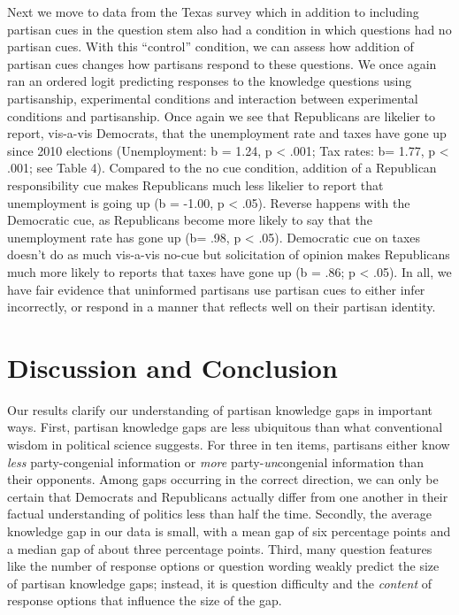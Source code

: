 \documentclass[12pt, letterpaper]{article}
\begin{document}
Next we move to data from the Texas survey which in addition to including partisan cues in the question stem also had a condition in which questions had no partisan cues. With this ``control'' condition, we can assess how addition of partisan cues changes how partisans respond to these questions. We once again ran an ordered logit predicting responses to the knowledge questions using partisanship, experimental conditions and interaction between experimental conditions and partisanship. Once again we see that Republicans are likelier to report, vis-a-vis Democrats, that the unemployment rate and taxes have gone up since 2010 elections (Unemployment: b = 1.24, p < .001;  Tax rates: b= 1.77, p < .001; see Table 4). Compared to the no cue condition, addition of a Republican responsibility cue makes Republicans much less likelier to report that unemployment is going up (b = -1.00, p < .05). Reverse happens with the Democratic cue, as Republicans become more likely to say that the unemployment rate has gone up (b= .98, p < .05). Democratic cue on taxes doesn't do as much vis-a-vis no-cue but solicitation of opinion makes Republicans much more likely to reports that taxes have gone up (b = .86; p < .05). In all, we have fair evidence that uninformed partisans use partisan cues to either infer incorrectly, or respond in a manner that reflects well on their partisan identity. 

\section*{Discussion and Conclusion}

Our results clarify our understanding of partisan knowledge gaps in important ways. First, partisan knowledge gaps are less ubiquitous than what conventional wisdom in political science suggests. For three in ten items, partisans either know \textit{less} party-congenial information or \textit{more} party-\textit{un}congenial information than their opponents. Among gaps occurring in the correct direction, we can only be certain that Democrats and Republicans actually differ from one another in their factual understanding of politics less than half the time. Secondly, the average knowledge gap in our data is small, with a mean gap of six percentage points and a median gap of about three percentage points. Third, many question features like the number of response options or question wording weakly predict the size of partisan knowledge gaps; instead, it is question difficulty and the \textit{content} of response options that influence the size of the gap.
\end{document}
